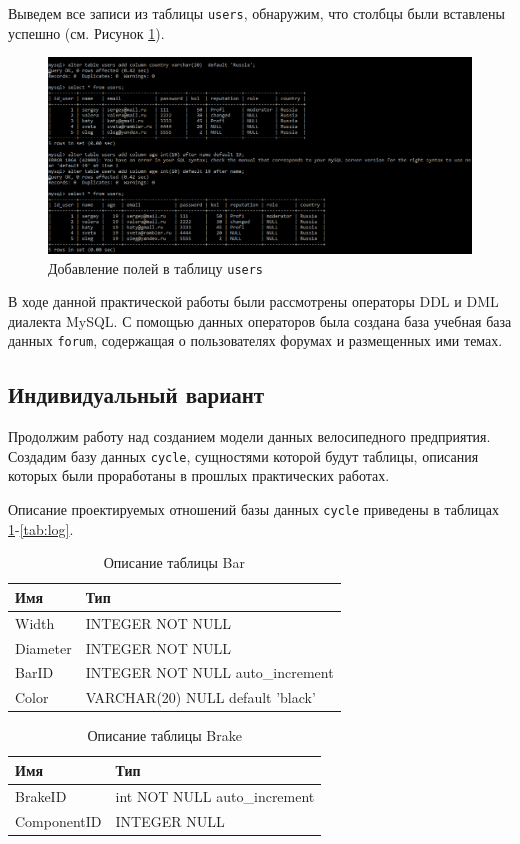 \documentclass[a4paper,14pt]{extarticle}
\newcommand{\individual}{Индивидуальный вариант~}
\begin{document}
Выведем все записи из таблицы \texttt{users}, обнаружим, что столбцы были вставлены успешно (см. Рисунок \ref{fig:alter-add-forum}).

\begin{figure}[h!]
	\centering
	\includegraphics[width=0.6\linewidth]{images/alter-add-forum}
	\caption{Добавление полей в таблицу \texttt{users}}
	\label{fig:alter-add-forum}
\end{figure}

В ходе данной практической работы были рассмотрены операторы DDL и DML диалекта MySQL. С помощью данных операторов была создана база учебная база данных \texttt{forum}, содержащая о пользователях форумах и размещенных ими темах.

\subsection{\individual}

Продолжим работу над созданием модели данных велосипедного предприятия. Создадим базу данных \texttt{cycle}, сущностями  которой будут таблицы, описания которых были проработаны в прошлых практических работах. 

Описание проектируемых отношений базы данных \texttt{cycle} приведены в таблицах \ref{tab:bar}-\ref{tab:log}.

\begin{table}[h!] 
 \centering
	\caption{Описание таблицы Bar}
	\begin{tabular}{|l|l|}
  \hline \textbf{Имя} & \textbf{Тип} \\
		\hline
		Width & INTEGER NOT NULL \\ \hline
		Diameter & INTEGER NOT NULL \\ \hline
		BarID & INTEGER NOT NULL auto\_increment \\ \hline
		Color & VARCHAR(20) NULL default 'black' \\ \hline
	\end{tabular}
	\label{tab:bar}
\end{table}

\begin{table}[h!] 
 \centering
	\caption{Описание таблицы Brake}
	\begin{tabular}{|l|l|}
  \hline \textbf{Имя} & \textbf{Тип} \\
		\hline
		BrakeID &       int NOT NULL auto\_increment \\ \hline
		ComponentID &   INTEGER NULL \\ \hline
	\end{tabular}
	\label{tab:brake}
\end{table}
\end{document}
